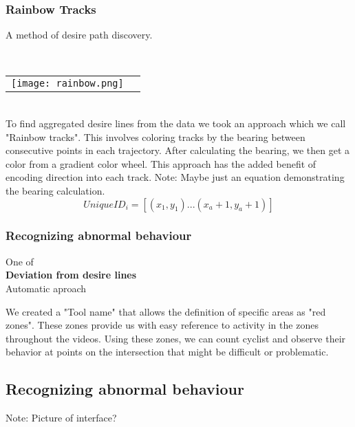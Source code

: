 \subsubsection{Rainbow Tracks}

A method of desire path discovery.

\ \\ 
\noindent
\begin{tabular}{@{}cc}
\texttt{[image: rainbow.png]} 
\end{tabular}
\label{Rainbow}
\ \\

To find aggregated desire lines from the data we took an approach which we call "Rainbow tracks". This involves coloring tracks by the bearing between consecutive points in each trajectory. After calculating the bearing, we then get a color from a gradient color wheel. This approach has the added benefit of encoding direction into 
each track.
Note: Maybe just an equation demonstrating the bearing calculation.
\ \\ 

\begin{equation}
  UniqueID_i = [(x_1, y_1)...(x_a+1, y_a+1)]\label{eq:3}
\end{equation}

\subsubsection{Recognizing abnormal behaviour}

One of
\ \\

\textbf{Deviation from desire lines} \\
Automatic aproach


\color{red}
We created a "Tool name" that allows the definition of specific areas as "red zones". These zones provide us with easy reference to activity in the zones throughout the videos.
Using these zones, we can count cyclist and observe their behavior at points on the intersection that might be difficult or
problematic.

\subsection{Recognizing abnormal behaviour}

Note: Picture of interface?
